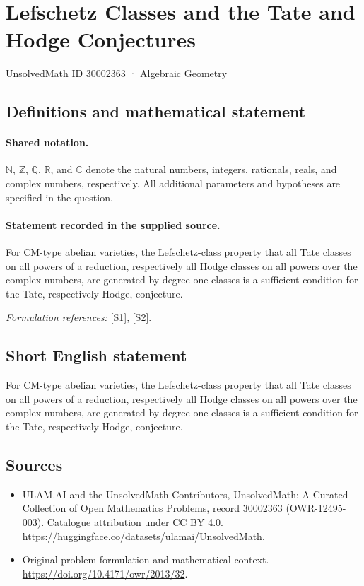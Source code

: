 \documentclass[11pt]{article}
\newcommand{\sref}[2]{\hyperlink{source:#1:#2}{[S#2]}}
\begin{document}
\setcounter{section}{30002362}
\section{Lefschetz Classes and the Tate and Hodge Conjectures}\label{30002363}
{\small UnsolvedMath ID 30002363 · Algebraic Geometry}
\subsection{Definitions and mathematical statement}

\paragraph{Shared notation.}$\mathbb N$, $\mathbb Z$, $\mathbb Q$, $\mathbb R$, and $\mathbb C$ denote the natural numbers, integers, rationals, reals, and complex numbers, respectively. All additional parameters and hypotheses are specified in the question.


\paragraph{Statement recorded in the supplied source.}
For CM-type abelian varieties, the Lefschetz-class property that all Tate classes on all powers of a reduction, respectively all Hodge classes on all powers over the complex numbers, are generated by degree-one classes is a sufficient condition for the Tate, respectively Hodge, conjecture.
\par\smallskip\textit{Formulation references:} \sref{30002363}{1}, \sref{30002363}{2}.
\subsection{Short English statement}
For CM-type abelian varieties, the Lefschetz-class property that all Tate classes on all powers of a reduction, respectively all Hodge classes on all powers over the complex numbers, are generated by degree-one classes is a sufficient condition for the Tate, respectively Hodge, conjecture.
\subsection{Sources}
\begin{itemize}
\item[\hypertarget{source:30002363:1}{S1}] ULAM.AI and the UnsolvedMath Contributors, UnsolvedMath: A Curated Collection of Open Mathematics Problems, record 30002363 (OWR-12495-003). Catalogue attribution under CC BY 4.0.
\url{https://huggingface.co/datasets/ulamai/UnsolvedMath}.
\item[\hypertarget{source:30002363:2}{S2}] Original problem formulation and mathematical context.
\url{https://doi.org/10.4171/owr/2013/32}.
\end{itemize}
\label{end:30002363}
\end{document}
